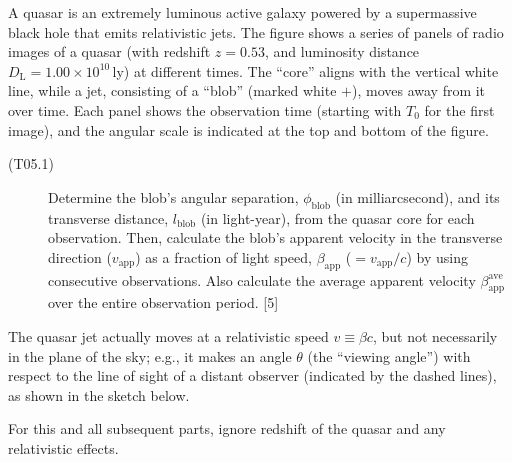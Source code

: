 A quasar is an extremely luminous active galaxy powered by a supermassive
black hole that emits relativistic jets. The figure shows a series of panels
of radio images of a quasar (with redshift $z = 0.53$, and luminosity distance
$D_{\mathrm{L}} = 1.00 \times 10^{10}$\,ly) at different times. The ``core''
aligns with the vertical white line, while a jet, consisting of a ``blob''
(marked white $+$), moves away from it over time. Each panel shows the
observation time (starting with $T_0$ for the first image), and the angular
scale is indicated at the top and bottom of the figure.


\begin{description}
\item[(T05.1)] Determine the blob's angular separation, $\phi_{\mathrm{blob}}$
  (in milliarcsecond), and its transverse distance, $l_{\mathrm{blob}}$ (in
  light-year), from the quasar core for each observation. Then, calculate the
  blob's apparent velocity in the transverse direction ($v_{\mathrm{app}}$) as
  a fraction of light speed, $\beta_{\mathrm{app}}$
  ($= v_{\mathrm{app}}/c$) by using consecutive observations. Also calculate
  the average apparent velocity $\beta_{\mathrm{app}}^{\mathrm{ave}}$ over the
  entire observation period. \hfill[5]
\end{description}

The quasar jet actually moves at a relativistic speed $v \equiv \beta c$, but
not necessarily in the plane of the sky; e.g., it makes an angle $\theta$ (the
``viewing angle'') with respect to the line of sight of a distant observer
(indicated by the dashed lines), as shown in the sketch below.

For this and all subsequent parts, ignore redshift of the quasar and any
relativistic effects.


